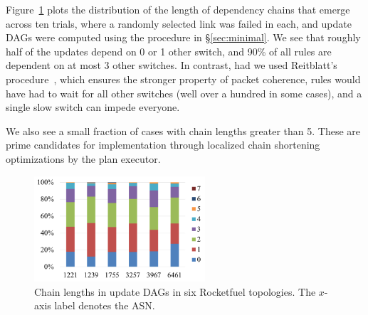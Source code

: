 Figure~\ref{fig:as} plots the distribution of the length of dependency chains that emerge across ten trials, where a randomly selected link was failed in each, and update DAGs were computed using the procedure in \S\ref{sec:minimal}. We see that roughly half of the updates depend on 0 or 1 other switch, and 90\% of all rules are dependent on at most 3 other switches. In contrast, had we used Reitblatt's procedure~\cite{safeupdate}, which ensures the stronger property of packet coherence, rules would have had to wait for all other switches (well over a hundred in some cases), and a single slow switch can impede everyone.

We also see a small fraction of cases with chain lengths greater than 5. These are prime candidates for implementation through localized chain shortening optimizations by the plan executor.



\begin{figure}[t!]
  \centering
  \includegraphics[width=2.5in]{figures/as.png}
  \vspace{-10pt}
  \caption{Chain lengths in update DAGs in six Rocketfuel topologies. The $x$-axis label denotes the ASN.}\label{fig:as}
\end{figure}

